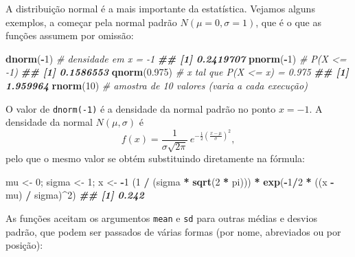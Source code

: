 \documentclass[
  portuguese,
  11pt,
  openany]{book}
\newenvironment{Shaded}{\begin{snugshade}}{\end{snugshade}}
\newcommand{\CommentTok}[1]{\textcolor[rgb]{0.56,0.35,0.01}{\textit{#1}}}
\newcommand{\DecValTok}[1]{\textcolor[rgb]{0.00,0.00,0.81}{#1}}
\newcommand{\DocumentationTok}[1]{\textcolor[rgb]{0.56,0.35,0.01}{\textbf{\textit{#1}}}}
\newcommand{\FloatTok}[1]{\textcolor[rgb]{0.00,0.00,0.81}{#1}}
\newcommand{\FunctionTok}[1]{\textcolor[rgb]{0.13,0.29,0.53}{\textbf{#1}}}
\newcommand{\NormalTok}[1]{#1}
\newcommand{\OtherTok}[1]{\textcolor[rgb]{0.56,0.35,0.01}{#1}}
\newcommand{\SpecialCharTok}[1]{\textcolor[rgb]{0.81,0.36,0.00}{\textbf{#1}}}
\begin{document}
A distribuição normal é a mais importante da estatística. Vejamos alguns exemplos, a
começar pela normal padrão \(N(\mu = 0, \sigma = 1)\), que é o que as funções assumem por
omissão:

\begin{Shaded}
\begin{Highlighting}[]
\FunctionTok{dnorm}\NormalTok{(}\SpecialCharTok{{-}}\DecValTok{1}\NormalTok{)      }\CommentTok{\# densidade em x = {-}1}
\DocumentationTok{\#\# [1] 0.2419707}
\FunctionTok{pnorm}\NormalTok{(}\SpecialCharTok{{-}}\DecValTok{1}\NormalTok{)      }\CommentTok{\# P(X \textless{}= {-}1)}
\DocumentationTok{\#\# [1] 0.1586553}
\FunctionTok{qnorm}\NormalTok{(}\FloatTok{0.975}\NormalTok{)   }\CommentTok{\# x tal que P(X \textless{}= x) = 0.975}
\DocumentationTok{\#\# [1] 1.959964}
\FunctionTok{rnorm}\NormalTok{(}\DecValTok{10}\NormalTok{)      }\CommentTok{\# amostra de 10 valores (varia a cada execução)}
\end{Highlighting}
\end{Shaded}

O valor de \texttt{dnorm(-1)} é a densidade da normal padrão no ponto \(x = -1\). A densidade da
normal \(N(\mu, \sigma)\) é
\[f(x) = \frac{1}{\sigma\sqrt{2\pi}}\, e^{-\frac{1}{2}\left(\frac{x - \mu}{\sigma}\right)^2},\]
pelo que o mesmo valor se obtém substituindo diretamente na fórmula:

\begin{Shaded}
\begin{Highlighting}[]
\NormalTok{mu }\OtherTok{\textless{}{-}} \DecValTok{0}\NormalTok{; sigma }\OtherTok{\textless{}{-}} \DecValTok{1}\NormalTok{; x }\OtherTok{\textless{}{-}} \SpecialCharTok{{-}}\DecValTok{1}
\NormalTok{(}\DecValTok{1} \SpecialCharTok{/}\NormalTok{ (sigma }\SpecialCharTok{*} \FunctionTok{sqrt}\NormalTok{(}\DecValTok{2} \SpecialCharTok{*}\NormalTok{ pi))) }\SpecialCharTok{*} \FunctionTok{exp}\NormalTok{(}\SpecialCharTok{{-}}\DecValTok{1}\SpecialCharTok{/}\DecValTok{2} \SpecialCharTok{*}\NormalTok{ ((x }\SpecialCharTok{{-}}\NormalTok{ mu) }\SpecialCharTok{/}\NormalTok{ sigma)}\SpecialCharTok{\^{}}\DecValTok{2}\NormalTok{)}
\DocumentationTok{\#\# [1] 0.242}
\end{Highlighting}
\end{Shaded}

As funções aceitam os argumentos \texttt{mean} e \texttt{sd} para outras médias e desvios padrão, que
podem ser passados de várias formas (por nome, abreviados ou por posição):
\end{document}
